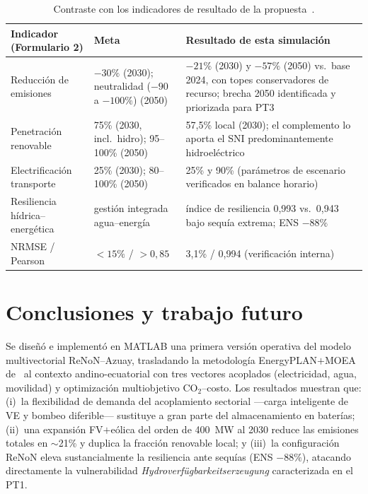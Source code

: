 \documentclass[11pt,a4paper]{article}
\begin{document}
\begin{table}[htbp]
\centering\small
\caption{Contraste con los indicadores de resultado de la propuesta~\cite{formulario2}.}
\label{tab:metas}
\begin{tabular}{p{4.1cm}p{4.3cm}p{5.6cm}}
\toprule
\textbf{Indicador (Formulario 2)} & \textbf{Meta} & \textbf{Resultado de esta simulaci\'on} \\
\midrule
Reducci\'on de emisiones & $-30\%$ (2030); neutralidad ($-90$ a $-100\%$) (2050) &
$-21\%$ (2030) y $-57\%$ (2050) vs.\ base 2024, con topes conservadores de recurso;
brecha 2050 identificada y priorizada para PT3 \\
Penetraci\'on renovable & 75\% (2030, incl.\ hidro); 95--100\% (2050) &
57,5\% local (2030); el complemento lo aporta el SNI predominantemente hidroel\'ectrico \\
Electrificaci\'on transporte & 25\% (2030); 80--100\% (2050) &
25\% y 90\% (par\'ametros de escenario verificados en balance horario) \\
Resiliencia h\'idrica--energ\'etica & gesti\'on integrada agua--energ\'ia &
\'indice de resiliencia 0,993 vs.\ 0,943 bajo sequ\'ia extrema; ENS $-88\%$ \\
NRMSE / Pearson & $<15\%$ / $>0{,}85$ & 3,1\% / 0,994 (verificaci\'on interna) \\
\bottomrule
\end{tabular}
\end{table}

\section{Conclusiones y trabajo futuro}
Se dise\~n\'o e implement\'o en MATLAB una primera versi\'on operativa del modelo
multivectorial ReNoN--Azuay, trasladando la metodolog\'ia EnergyPLAN$+$MOEA
de~\cite{viesi2020} al contexto andino-ecuatorial con tres vectores acoplados
(electricidad, agua, movilidad) y optimizaci\'on multiobjetivo CO$_2$--costo. Los
resultados muestran que: (i)~la flexibilidad de demanda del acoplamiento sectorial
---carga inteligente de VE y bombeo diferible--- sustituye a gran parte del
almacenamiento en bater\'ias; (ii)~una expansi\'on FV$+$e\'olica del orden de 400~MW al
2030 reduce las emisiones totales en $\sim$21\% y duplica la fracci\'on renovable local;
y (iii)~la configuraci\'on ReNoN eleva sustancialmente la resiliencia ante sequ\'ias
(ENS $-88\%$), atacando directamente la vulnerabilidad
\emph{Hydroverf\"ugbarkeitserzeugung} caracterizada en el PT1.
\end{document}
